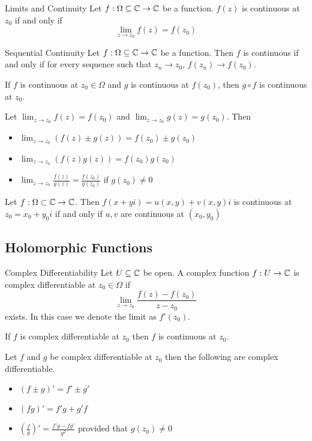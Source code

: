 \documentclass[a4paper]{article}
\begin{document}
\begin{thm}{Limits and Continuity}{} Let $f:\Omega\subseteq\mathbb{C}\to\mathbb{C}$ be a function. $f(z)$ is continuous at $z_0$ if and only if $$\lim_{z\to z_0}f(z)=f(z_0)$$
\end{thm}

\begin{thm}{Sequential Continuity}{} Let $f:\Omega\subseteq\mathbb{C}\to\mathbb{C}$ be a function. Then $f$ is continuous if and only if for every sequence such that $z_n\to z_0$, $f(z_n)\to f(z_0)$. 
\end{thm}

\begin{prp}{}{} If $f$ is continuous at $z_0\in\Omega$ and $g$ is continuous at $f(z_0)$, then $g\circ f$ is continuous at $z_0$. 
\end{prp}

\begin{prp}{}{} Let $\lim_{z\to z_0}f(z)=f(z_0)$ and $\lim_{z\to z_0}g(z)=g(z_0)$. Then
\begin{itemize}
\item $\lim_{z\to z_0}(f(z)\pm g(z))=f(z_0)\pm g(z_0)$
\item $\lim_{z\to z_0}(f(z)g(z))=f(z_0)g(z_0)$
\item $\lim_{z\to z_0}\frac{f(z)}{g(z)}=\frac{f(z_0)}{g(z_0)}$ if $g(z_0)\neq0$
\end{itemize}
\end{prp}

\begin{prp}{}{} Let $f:\Omega\subset\mathbb{C}\to\mathbb{C}$. Then $f(x+yi)=u(x,y)+v(x,y)i$ is continuous at $z_0=x_0+y_0i$ if and only if $u,v$ are continuous at $(x_0,y_0)$
\end{prp}

\subsection{Holomorphic Functions}
\begin{defn}{Complex Differentiability}{} Let $U\subseteq\mathbb{C}$ be open. A complex function $f:U\to\mathbb{C}$ is complex differentiable at $z_0\in\Omega$ if $$\lim_{z\to z_0}\frac{f(z)-f(z_0)}{z-z_0}$$ exists. In this case we denote the limit as $f'(z_0)$. 
\end{defn}

\begin{prp}{}{} If $f$ is complex differentiable at $z_0$ then $f$ is continuous at $z_0$. 
\end{prp}

\begin{prp}{}{} Let $f$ and $g$ be complex differentiable at $z_0$ then the following are complex differentiable. 
\begin{itemize}
\item $(f\pm g)'=f'\pm g'$
\item $(fg)'=f'g+g'f$
\item $\left(\frac{f}{g}\right)'=\frac{f'g-fg'}{g^2}$ provided that $g(z_0)\neq0$
\end{itemize}
\end{prp}
\end{document}
